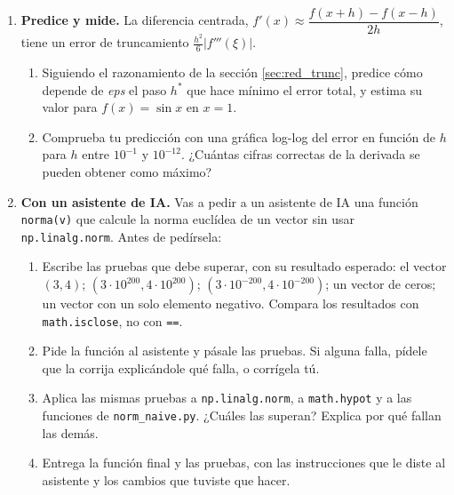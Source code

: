 \begin{enumerate}
\begin{verbatim}
def raices_A(a, b, c):
    d = math.sqrt(b**2 - 4*a*c)
    return (-b + d) / (2*a), (-b - d) / (2*a)

def raices_B(a, b, c):
    d = math.sqrt(b**2 - 4*a*c)
    q = -(b + math.copysign(d, b)) / 2
    return q / a, c / q

def raices_C(a, b, c):
    d = math.sqrt(b**2 - 4*a*c)
    x1 = (-b - d) / (2*a)
    return x1, c / (a*x1)
\end{verbatim}
\begin{enumerate}
\item Pruébalas con $a=1$, $b=10^8$, $c=1$ y con $a=1$, $b=-10^8$, $c=1$. ¿Cuál es correcta en todos los casos? ¿Cómo puedes saberlo sin conocer las raíces exactas? (Pista: el producto de las raíces es $c/a$ y su suma, $-b/a$.)
\item Explica, en términos de anulación catastrófica, por qué fallan las otras dos.
\end{enumerate}

\item \textbf{Predice y mide.} La diferencia centrada, $f'(x)\approx\dfrac{f(x+h)-f(x-h)}{2h}$, tiene un error de truncamiento $\frac{h^2}{6}\vert f'''(\xi)\vert$.
\begin{enumerate}
\item Siguiendo el razonamiento de la sección \ref{sec:red_trunc}, predice cómo depende de \emph{eps} el paso $h^*$ que hace mínimo el error total, y estima su valor para $f(x)=\sin x$ en $x=1$.
\item Comprueba tu predicción con una gráfica log-log del error en función de $h$ para $h$ entre $10^{-1}$ y $10^{-12}$. ¿Cuántas cifras correctas de la derivada se pueden obtener como máximo?
\end{enumerate}

\item \label{ej:norma_ia} \textbf{Con un asistente de IA.} Vas a pedir a un asistente de IA una función \texttt{norma(v)} que calcule la norma euclídea de un vector sin usar \texttt{np.linalg.norm}. Antes de pedírsela:
\begin{enumerate}
\item Escribe las pruebas que debe superar, con su resultado esperado: el vector $(3,4)$; $(3\cdot10^{200},4\cdot10^{200})$; $(3\cdot10^{-200},4\cdot10^{-200})$; un vector de ceros; un vector con un solo elemento negativo. Compara los resultados con \texttt{math.isclose}, no con \texttt{==}.
\item Pide la función al asistente y pásale las pruebas. Si alguna falla, pídele que la corrija explicándole qué falla, o corrígela tú.
\item Aplica las mismas pruebas a \texttt{np.linalg.norm}, a \texttt{math.hypot} y a las funciones de \texttt{norm\_naive.py}. ¿Cuáles las superan? Explica por qué fallan las demás.
\item Entrega la función final y las pruebas, con las instrucciones que le diste al asistente y los cambios que tuviste que hacer.
\end{enumerate}
\end{enumerate}

